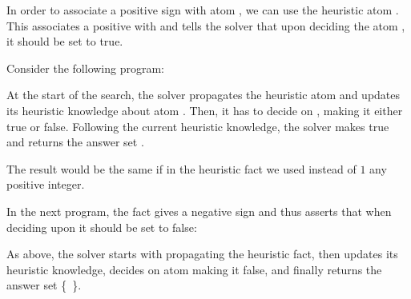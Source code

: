 In order to associate a positive sign with atom , we can use the heuristic atom . 
This associates a positive  with  and 
tells the solver that upon deciding the atom , it should be set to true.
\begin{example}
\label{example:psign}
Consider the following program:

At the start of the search, 
the solver propagates the heuristic atom 
and updates its heuristic knowledge about atom .
Then, it has to decide on , making it either true or false.
Following the current heuristic knowledge, 
the solver makes  true and returns the answer set .
\end{example}

\begin{note}
The result would be the same if in the heuristic fact we used instead of $1$ any positive integer.
\end{note}

\begin{example}
\label{example:nsign}
In the next program,
the  fact gives  a negative sign 
and thus asserts that when deciding upon  it should be set to false:

As above,
the solver starts with propagating the heuristic fact,
then
updates its heuristic knowledge,
decides on atom  making it false, and 
finally 
returns the answer set \mbox{\{ \}}.
\end{example}

